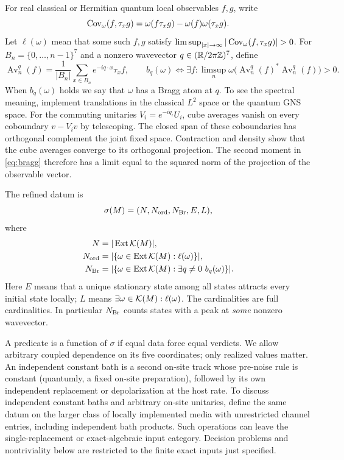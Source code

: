 For real classical or Hermitian quantum local observables $f,g$, write
\[
 \operatorname{Cov}_\omega(f,\tau_xg)=\omega(f\tau_xg)-\omega(f)\omega(\tau_xg).
\]
Let $\ell(\omega)$ mean that some such $f,g$ satisfy
$\limsup_{|x|\to\infty}|\Cov_\omega(f,\tau_xg)|>0$.
For $B_n=\{0,\ldots,n-1\}^7$ and a nonzero wavevector
$q\in(\mathbb R/2\pi\mathbb Z)^7$, define
\begin{equation}\label{eq:bragg}
 \operatorname{Av}_n^q(f)=\frac1{|B_n|}\sum_{x\in B_n}e^{-iq\cdot x}\tau_xf,
 \qquad b_q(\omega)\iff
 \exists f:\limsup_n\omega\bigl(\operatorname{Av}_n^q(f)^*\operatorname{Av}_n^q(f)\bigr)>0.
\end{equation}
When $b_q(\omega)$ holds we say that $\omega$ has a Bragg atom at $q$. To see the spectral meaning, implement translations in the classical $L^2$ space or the quantum GNS space. For the commuting unitaries $V_i=e^{-iq_i}U_i$, cube averages vanish on every coboundary $v-V_iv$ by telescoping. The closed span of these coboundaries has orthogonal complement the joint fixed space. Contraction and density show that the cube averages converge to its orthogonal projection. The second moment in \eqref{eq:bragg} therefore has a limit equal to the squared norm of the projection of the observable vector.

The refined datum is
\begin{equation}\label{eq:datum}
 \sigma(M)=(N,N_{\mathrm{ord}},N_{\mathrm{Br}},E,L),
\end{equation}
where
\begin{align*}
 N&=|\operatorname{Ext}\mathcal K(M)|,\\
 N_{\mathrm{ord}}&=|\{\omega\in\operatorname{Ext}\mathcal K(M):\ell(\omega)\}|,\\
 N_{\mathrm{Br}}&=|\{\omega\in\operatorname{Ext}\mathcal K(M):\exists q\ne0\ b_q(\omega)\}|.
\end{align*}
Here $E$ means that a unique stationary state among all states attracts every initial state locally; $L$ means $\exists\omega\in\mathcal K(M):\ell(\omega)$. The cardinalities are full cardinalities. In particular $N_{\mathrm{Br}}$ counts states with a peak at \emph{some} nonzero wavevector.

A predicate is a function of $\sigma$ if equal data force equal verdicts. We allow arbitrary coupled dependence on its five coordinates; only realized values matter. An independent constant bath is a second on-site track whose pre-noise rule is constant (quantumly, a fixed on-site preparation), followed by its own independent replacement or depolarization at the host rate. To discuss independent constant baths and arbitrary on-site unitaries, define the same datum on the larger class of locally implemented media with unrestricted channel entries, including independent bath products. Such operations can leave the single-replacement or exact-algebraic input category. Decision problems and nontriviality below are restricted to the finite exact inputs just specified.

